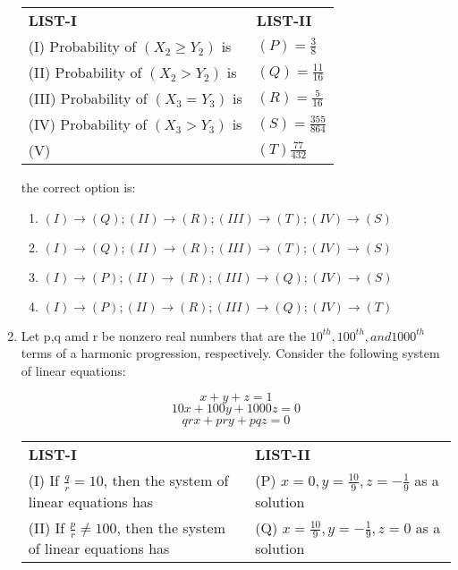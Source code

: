 \documentclass{article}
\begin{document}
\begin{enumerate}
\begin{center}
\begin{tabular}{l l}
    \textbf{LIST-I} & \textbf{LIST-II} \\
	(I) Probability of $ (X_2 \geq Y_2 )$ is &  $(P) = \frac{3}{8} $\\                                  	(II) Probability of $(X_2 > Y_2 )$ is &\( (Q) = \frac{11}{16} \)\\                                     
	(III) Probability of \( (X_3 = Y_3 )\) is & \((R) = \frac{5}{16} \)\\                              

	(IV) Probability of \( (X_3 > Y_3) \) is & \( (S) = \frac{355}{864} \)\\                                                    
	(V) & $(T)\frac{77}{432}$\\
	\end{tabular}
\end{center}
 the correct option is:
	\begin{enumerate}[label=\Alph*.]
	\item $(I)\to(Q);(II)\to(R);(III)\to(T);(IV)\to(S)$   
	\item$(I)\to(Q);(II)\to(R);(III)\to(T);(IV)\to(S)$
	\item $(I)\to(P);(II)\to(R);(III)\to(Q);(IV)\to(S)$
	\item $(I)\to(P);(II)\to(R);(III)\to(Q);(IV)\to(T)$
	\end{enumerate}

	\item Let p,q amd r  be nonzero real numbers that are the $10^{th}, 100^{th}, and 1000^{th}$ terms of a harmonic progression, respectively. Consider the following system of linear equations:

\[x + y + z = 1\]
\[10x + 100y + 1000z = 0\]
\[qr x + pr y + pq z = 0\]

\begin{center}                                                \begin{tabular}{l l}                                               \textbf{LIST-I} & \textbf{LIST-II} \\
	(I) If \( \frac{q}{r} = 10 \), then the system of linear equations has & (P) \( x = 0,  y = \frac{10}{9}, z = -\frac{1}{9} \) as a solution  \\

	(II) If \( \frac{p}{r} \neq 100 \), then the system of linear equations has & (Q) \( x = \frac{10}{9},  y = -\frac{1}{9},  z = 0 \) as a solution \\


\end{tabular}
\end{center}
\end{enumerate}
\end{document}

